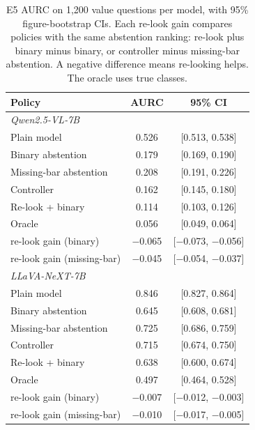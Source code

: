 \begin{table}[t]
\centering\small
\setlength{\tabcolsep}{3pt}
\begin{tabular}{lcc}
\toprule
Policy & AURC & 95\% CI \\
\midrule
\multicolumn{3}{l}{\textit{Qwen2.5-VL-7B}} \\
Plain model & 0.526 & [0.513, 0.538] \\
Binary abstention & 0.179 & [0.169, 0.190] \\
Missing-bar abstention & 0.208 & [0.191, 0.226] \\
Controller & 0.162 & [0.145, 0.180] \\
Re-look + binary & 0.114 & [0.103, 0.126] \\
Oracle & 0.056 & [0.049, 0.064] \\
\quad re-look gain (binary) & $-$0.065 & [$-$0.073, $-$0.056] \\
\quad re-look gain (missing-bar) & $-$0.045 & [$-$0.054, $-$0.037] \\
\midrule
\multicolumn{3}{l}{\textit{LLaVA-NeXT-7B}} \\
Plain model & 0.846 & [0.827, 0.864] \\
Binary abstention & 0.645 & [0.608, 0.681] \\
Missing-bar abstention & 0.725 & [0.686, 0.759] \\
Controller & 0.715 & [0.674, 0.750] \\
Re-look + binary & 0.638 & [0.600, 0.674] \\
Oracle & 0.497 & [0.464, 0.528] \\
\quad re-look gain (binary) & $-$0.007 & [$-$0.012, $-$0.003] \\
\quad re-look gain (missing-bar) & $-$0.010 & [$-$0.017, $-$0.005] \\
\bottomrule
\end{tabular}
\caption{E5 AURC on 1,200 value questions per model, with 95\% figure-bootstrap
CIs. Each re-look gain compares policies with the same abstention ranking:
re-look plus binary minus binary, or controller minus missing-bar abstention.
A negative difference means re-looking helps. The oracle uses true classes.}
\label{tab:e5}
\end{table}

